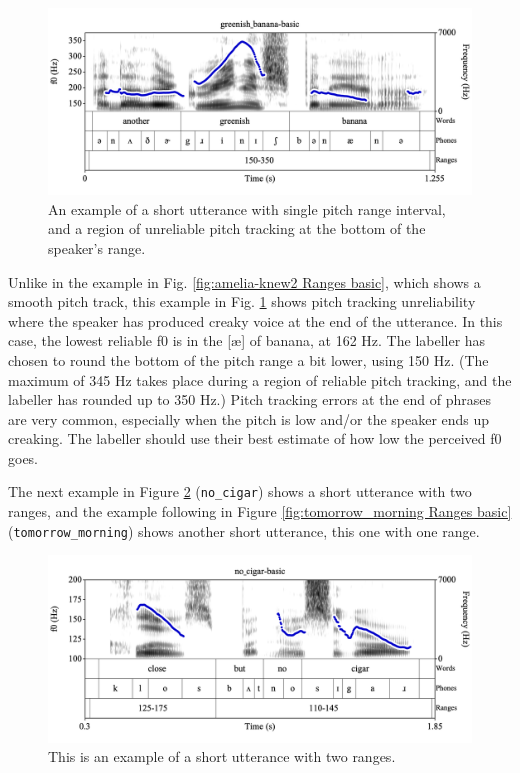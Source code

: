 \documentclass[11pt, twoside]{memoir}
\begin{document}
\begin{figure}[H]
\centering
%
\includegraphics[width=.875\linewidth]{Ranges-greenish_banana-basic.png}
%
\caption[An example of a short utterance with single pitch range interval.]{An example of a short utterance with single pitch range interval, and a region of unreliable pitch tracking at the bottom of the speaker’s range.%
\label{fig:greenish-banana Ranges basic}%
%
}
\end{figure}

Unlike in the example in Fig. \ref{fig:amelia-knew2 Ranges basic}, which shows a smooth pitch track, this example in Fig. \ref{fig:greenish-banana Ranges basic} shows pitch tracking unreliability where the speaker has produced creaky voice at the end of the utterance. In this case, the lowest reliable f0 is in the [æ] of banana, at 162 Hz. The labeller has chosen to round the bottom of the pitch range a bit lower, using 150 Hz. (The maximum of 345 Hz takes place during a region of reliable pitch tracking, and the labeller has rounded up to 350 Hz.) Pitch tracking errors at the end of phrases are very common, especially when the pitch is low and/or the speaker ends up creaking. The labeller should use their best estimate of how low the perceived f0 goes. 

The next example in Figure \ref{fig:no_cigar Ranges basic} (\texttt{no\_cigar}) shows a short utterance with two ranges, and the example following in Figure \ref{fig:tomorrow_morning Ranges basic} (\texttt{tomorrow\_morning}) shows another short utterance, this one with one range.


\begin{figure}[H]
\centering
%
\includegraphics[width=.875\linewidth]{Ranges-no_cigar-basic.png}
%
\caption{This is an example of a short utterance with two ranges.%
\label{fig:no_cigar Ranges basic}%
%
}
\end{figure}
\end{document}
